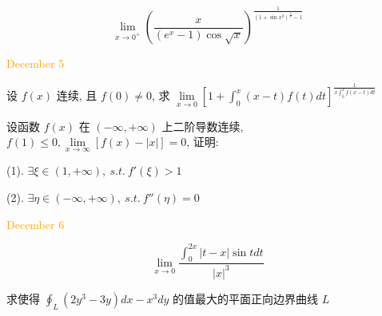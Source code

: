 \begin{example}[][Exam: 38.1.8]
    $$\lim\limits_{x\to 0^{+}}\left(\dfrac{x}{(e^{x}-1)\cos\sqrt{x}}\right)^{\frac{1}{(1+\sin x^{2})^{\frac{1}{x}}-1}}$$
\end{example}

\begin{solution}
	
\end{solution}


\textcolor{orange}{December 5}

\begin{example}[][Exam: 38.1.9]
	设 $f(x)$ 连续, 且 $f(0)\neq 0$, 求 $\lim\limits_{x\to 0}\left[1+\int_{0}^{x}(x-t)f(t)dt \right]^{\frac{1}{x\int_{0}^{x}f(x-t)dt}}$

\end{example}

\begin{solution}
	
\end{solution}

\begin{example}[][Exam: 38.1.10]
	设函数 $f(x)$ 在 $(-\infty,+\infty)$ 上二阶导数连续, $f(1)\leq 0, \lim\limits_{x\to \infty}\left[ f(x)-|x|\right]=0$, 证明:

(1). $\exists \xi\in(1,+\infty),\ s.t.\ f'(\xi)>1$

(2). $\exists \eta\in(-\infty,+\infty),\ s.t.\ f''(\eta)=0$
\end{example}

\begin{solution}
	
\end{solution}


\textcolor{orange}{December 6}

\begin{example}[][Exam: 38.1.11]
	$$\lim\limits_{x\to 0}\dfrac{\int_{0}^{2x}|t-x|\sin tdt}{|x|^{3}}$$
\end{example}

\begin{solution}
	
\end{solution}

\begin{example}[][Exam: 38.1.12]
	求使得 $\displaystyle{\oint_{L}(2y^{3}-3y)dx-x^{3}dy}$ 的值最大的平面正向边界曲线 $L$

\end{example}

\begin{solution}
	
\end{solution}


